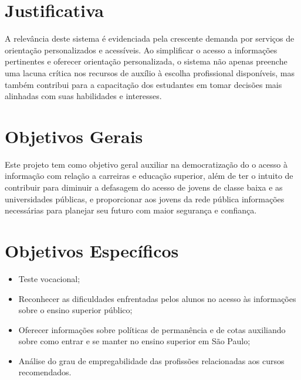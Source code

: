 

\section{Justificativa}

A relevância deste sistema é evidenciada pela crescente demanda por serviços de orientação personalizados e acessíveis. Ao simplificar o acesso a informações pertinentes e oferecer orientação personalizada, o sistema não apenas preenche uma lacuna crítica nos recursos de auxílio à escolha profissional disponíveis, mas também contribui para a capacitação dos estudantes em tomar decisões mais alinhadas com suas habilidades e interesses.

\section{Objetivos Gerais}

Este projeto tem como objetivo geral auxiliar na democratização do o acesso à informação com relação a carreiras e educação superior, além de ter o intuito de contribuir para diminuir a defasagem do acesso de jovens de classe baixa e as universidades públicas, e proporcionar aos jovens da rede pública informações necessárias para planejar seu futuro com maior segurança e confiança.

\section{Objetivos Específicos}

\begin{itemize}
\item Teste vocacional;
\item Reconhecer as dificuldades enfrentadas pelos alunos no acesso às informações sobre o  ensino superior público;
\item Oferecer informações sobre políticas de permanência e de cotas auxiliando sobre como entrar e se manter no ensino superior em São Paulo;
\item Análise do grau de empregabilidade das profissões relacionadas aos cursos recomendados.
\end{itemize}
